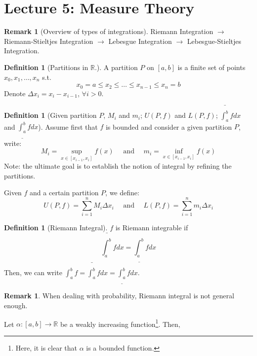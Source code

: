 \documentclass[12pt]{article}
\newcommand{\R}{{\mathbb R}}
\theoremstyle{definition}
\newtheorem{definition}[theorem]{Definition}
\newtheorem{remark}[theorem]{Remark}
\theoremstyle{plain}
\begin{document}
\section{Lecture 5: Measure Theory}

\begin{remark}
    [Overview of types of integrations]
    Riemann Integration $\to$ Riemann-Stieltjes Integration $\to$ Lebesgue
    Integration $\to $ Lebesgue-Stieltjes Integration.
\end{remark}

\begin{definition}
    [Partitions in $\R$.]
    A partition $P$ on $[a,b]$ is a finite set of points $x_0, x_1, \ldots, x_n$
    s.t.
    \[
        x_0 = a \le x_2 \le \ldots \le x_{n-1} \le x_n = b
    \]
    Denote $\Delta x_i = x_i - x_{i-1}$, $\forall i > 0$.
\end{definition}

\begin{definition}
    [Given partition $P$, $M_i$ and $m_i$; $U(P,f)$ and $L(P,f)$;
    $\bar{\int_a^b} f dx$ and $\underline{\int_a^b } fdx$]
    Assume first that $f$ is bounded and consider a given partition $P$, write:
    \[
        M_i = \sup_{x \in [x_{i-1}, x_i]} f(x)
        \quad \text{ and } \quad
        m_i = \inf_{x \in [x_{i-1}, x_i]} f(x)
    \]
    Note: the ultimate goal is to establish the notion of integral by refining the
    partitions.

    Given $f$ and a certain partition $P$, we define:
    \[
        U(P, f) = \sum_{i=1}^n M_i \Delta x_i
        \quad \text{ and } \quad
        L(P, f) = \sum_{i=1}^n m_i \Delta x_i
    \]
\end{definition}

\begin{definition}
    [Riemann Integral]
    $f$ is Riemann integrable if
    \[
        \bar{\int_a^b} f dx = \underline{\int_a^b} fdx
    \]
    Then, we can write $\int_a^b f =
    \bar{\int_a^b} f dx = \underline{\int_a^b} fdx$.
\end{definition}

\begin{remark}
    When dealing with probability, Riemann integral is not general enough.
\end{remark}

\begin{example}
    Let $\alpha: [a,b] \to \R$ be a weakly increasing function\footnote{Here, it 
    is clear that $\alpha$ is a bounded function.}. Then, 
\end{example}



\end{document}
